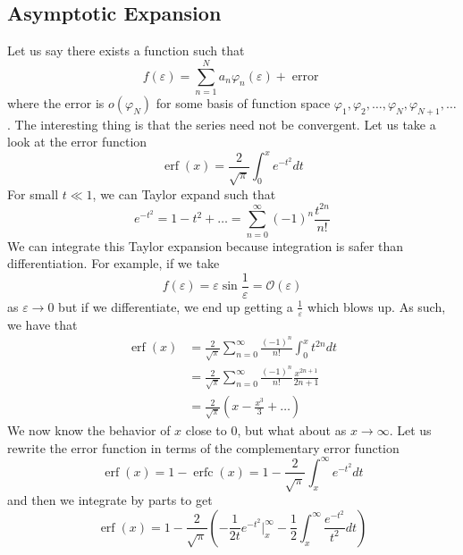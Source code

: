 \documentclass{article}
\begin{document}
\subsection{Asymptotic Expansion}
Let us say there exists a function such that 
\begin{equation*}
    f(\varepsilon)=\sum^N_{n=1} a_n\varphi_n(\varepsilon) + \operatorname{error}
\end{equation*}
where the error is $o(\varphi_{N})$ for some basis of function space $\varphi_1,\varphi_2,\ldots,\varphi_N,\varphi_{N+1},\ldots$. The interesting thing is that the series need not be convergent. Let us take a look at the error function 
\begin{equation*}
    \operatorname{erf}(x)=\frac{2}{\sqrt \pi} \int^x_0e^{-t^2}dt
\end{equation*}
For small $t\ll1$, we can Taylor expand such that 
\begin{equation*}
    e^{-t^2} = 1-t^2+\ldots=\sum^\infty_{n=0} (-1)^n\frac{t^{2n}}{n!}
\end{equation*}
We can integrate this Taylor expansion because integration is safer than differentiation. For example, if we take 
\begin{equation*}
    f(\varepsilon)=\varepsilon\sin \frac{1}{\varepsilon} = \mathcal{O}(\varepsilon)
\end{equation*}
as $\varepsilon\rightarrow 0$ but if we differentiate, we end up getting a $\frac{1}{\varepsilon}$ which blows up. As such, we have that 
\begin{equation*}
    \begin{split}
        \operatorname{erf}(x) &=\frac{2}{\sqrt{\pi}}\sum^\infty_{n=0} \frac{(-1)^n}{n!}\int^x_0 t^{2n}dt \\ &= \frac{2}{\sqrt{\pi}} \sum^\infty_{n=0} \frac{(-1)^n}{n!}\frac{x^{2n+1}}{2n+1} \\
        &= \frac{2}{\sqrt \pi} \left( x-\frac{x^3}{3}+\ldots \right)
    \end{split}
\end{equation*}
We now know the behavior of $x$ close to $0$, but what about as $x\rightarrow \infty$. Let us rewrite the error function in terms of the complementary error function 
\begin{equation*}
    \operatorname{erf}(x)=1-\operatorname{erfc}(x)=1-\frac{2}{\sqrt \pi}\int^\infty_x e^{-t^2}dt
\end{equation*}
and then we integrate by parts to get 
\begin{equation*}
    \operatorname{erf}(x) =1-\frac{2}{\sqrt \pi} \left( -\frac{1}{2t}e^{-t^2} \Bigg|^\infty_x -\frac{1}{2}\int^\infty_x \frac{e^{-t^2}}{t^2} dt\right)
\end{equation*}
\end{document}
